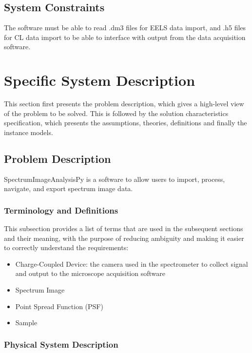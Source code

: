 \documentclass[12pt]{article}
\newcommand{\progname}{SpectrumImageAnalysisPy} %
\begin{document}
\subsection{System Constraints}

The software must be able to read .dm3 files for EELS data import, and .h5 files for CL data import to be able to interface with output from the data acquisition software.

\section{Specific System Description}

This section first presents the problem description, which gives a high-level
view of the problem to be solved.  This is followed by the solution characteristics
specification, which presents the assumptions, theories, definitions and finally
the instance models.  

\subsection{Problem Description} \label{Sec_pd}

\progname{} is a software to allow users to import, process, navigate, and export spectrum image data. 

\subsubsection{Terminology and  Definitions}

This subsection provides a list of terms that are used in the subsequent
sections and their meaning, with the purpose of reducing ambiguity and making it
easier to correctly understand the requirements:

\begin{itemize}
	\item Charge-Coupled Device: the camera used in the spectrometer to collect signal and output to the microscope acquisition software
	\item Spectrum Image
	\item Point Spread Function (PSF)
	\item Sample
\end{itemize}

\subsubsection{Physical System Description}
\end{document}
